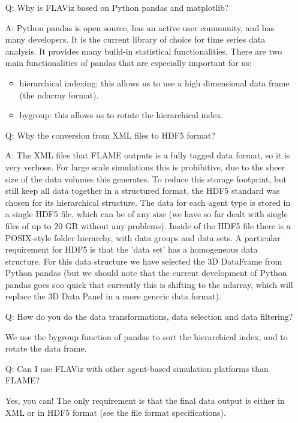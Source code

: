 \documentclass[10pt,a4paper]{article}
\begin{document}
\begin{itemize}
\item[Q:] Why is FLAViz based on Python pandas and matplotlib?

A: Python pandas is open source, has an active user community, and has many developers. It is the current library of choice for time series data analysis.
It provides many build-in statistical functionalities.
There are two main functionalities of pandas that are especially important for us:

\begin{itemize}
\item hierarchical indexing: this allows us to use a high dimensional data frame (the ndarray format).
\item bygroup: this allows us to rotate the hierarchical index.
\end{itemize}

\item[Q:] Why the conversion from XML files to HDF5 format?

A: The XML files that FLAME outputs is a fully tagged data format, so it is very verbose. For large scale simulations this is prohibitive, due to the sheer size of the data volumes this generates.
To reduce this storage footprint, but still keep all data together in a structured format, the HDF5 standard was chosen for its hierarchical structure.
The data for each agent type is stored in a single HDF5 file, which can be of any size (we have so far dealt with single files of up to 20 GB without any problems).
Inside of the HDF5 file there is a POSIX-style folder hierarchy, with data groups and data sets. A particular requirement for HDF5 is that the 'data set' has a homogeneous data structure.
For this data structure we have selected the 3D DataFrame from Python pandas (but we should note that the current development of Python pandas goes soo quick that currently this is shifting to the ndarray, which will replace the 3D Data Panel in a more generic data format).

\item[Q:] How do you do the data transformations, data selection and data filtering?

We use the bygroup function of pandas to sort the hierarchical index, and to rotate the data frame.

\item[Q:] Can I use FLAViz with other agent-based simulation platforms than FLAME?

Yes, you can! The only requirement is that the final data output is either in XML or in HDF5 format (see the file format specifications).
\end{itemize}
\end{document}
